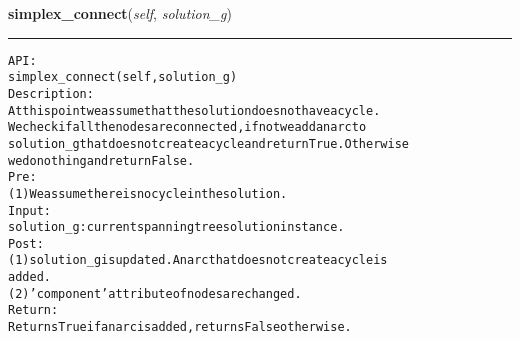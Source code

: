     \label{coinor:gimpy:graph:Graph:simplex_connect}

    \vspace{0.5ex}

\hspace{.8\funcindent}\begin{boxedminipage}{\funcwidth}

    \raggedright \textbf{simplex\_connect}(\textit{self}, \textit{solution\_g})

    \vspace{-1.5ex}

    \rule{\textwidth}{0.5\fboxrule}
\setlength{\parskip}{2ex}
\begin{alltt}

API:
    simplex\_connect(self, solution\_g)
Description:
    At this point we assume that the solution does not have a cycle.
    We check if all the nodes are connected, if not we add an arc to
    solution\_g that does not create a cycle and return True. Otherwise
    we do nothing and return False.
Pre:
    (1) We assume there is no cycle in the solution.
Input:
    solution\_g: current spanning tree solution instance.
Post:
    (1) solution\_g is updated. An arc that does not create a cycle is
    added.
    (2) 'component' attribute of nodes are changed.
Return:
    Returns True if an arc is added, returns False otherwise.
\end{alltt}

\setlength{\parskip}{1ex}
    \end{boxedminipage}

    \label{coinor:gimpy:graph:Graph:simplex_search}

    \vspace{0.5ex}


